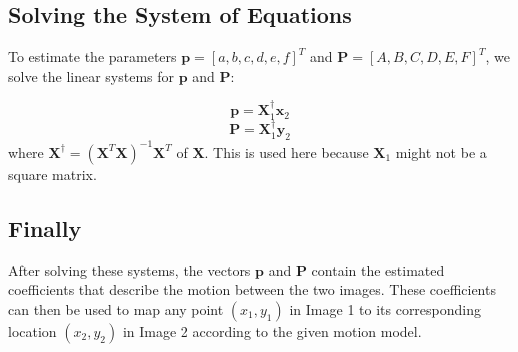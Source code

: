 \documentclass{article}
\begin{document}
\subsection*{Solving the System of Equations}
To estimate the parameters \( \mathbf{p} = [a, b, c, d, e, f]^T \) and \( \mathbf{P} = [A, B, C, D, E, F]^T \), we solve the linear systems for \( \mathbf{p} \) and \( \mathbf{P} \):

\[
\mathbf{p} = \mathbf{X}_1^\dagger \mathbf{x}_2
\]
\[
\mathbf{P} = \mathbf{X}_1^\dagger \mathbf{y}_2
\]
where \( \mathbf{X}^\dagger = (\mathbf{X}^T \mathbf{X})^{-1} \mathbf{X}^T
\) of \( \mathbf{X} \). This is used here because \( \mathbf{X}_1 \) might not be a square matrix.

\subsection*{Finally}
After solving these systems, the vectors \( \mathbf{p} \) and \( \mathbf{P} \) contain the estimated coefficients that describe the motion between the two images. These coefficients can then be used to map any point \( (x_1, y_1) \) in Image 1 to its corresponding location \( (x_2, y_2) \) in Image 2 according to the given motion model.
\end{document}
